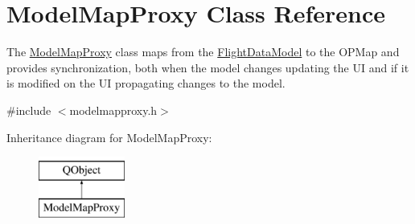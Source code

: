 \hypertarget{class_model_map_proxy}{\section{Model\-Map\-Proxy Class Reference}
\label{class_model_map_proxy}
}


The \hyperlink{class_model_map_proxy}{Model\-Map\-Proxy} class maps from the \hyperlink{class_flight_data_model}{Flight\-Data\-Model} to the O\-P\-Map and provides synchronization, both when the model changes updating the U\-I and if it is modified on the U\-I propagating changes to the model.  




{\ttfamily \#include $<$modelmapproxy.\-h$>$}

Inheritance diagram for Model\-Map\-Proxy\-:\begin{figure}[H]
\begin{center}
\leavevmode
\includegraphics[height=2.000000cm]{class_model_map_proxy}
\end{center}
\end{figure}
